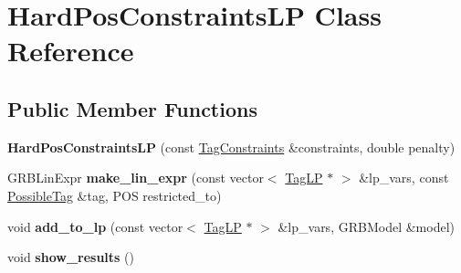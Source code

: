 \hypertarget{classHardPosConstraintsLP}{
\section{HardPosConstraintsLP Class Reference}
\label{classHardPosConstraintsLP}
}
\subsection*{Public Member Functions}
\begin{DoxyCompactItemize}
\item 
\hypertarget{classHardPosConstraintsLP_a2979e37eb163b00f48a38ee8fccd1a64}{
{\bfseries HardPosConstraintsLP} (const \hyperlink{classTagConstraints}{TagConstraints} \&constraints, double penalty)}
\label{classHardPosConstraintsLP_a2979e37eb163b00f48a38ee8fccd1a64}

\item 
\hypertarget{classHardPosConstraintsLP_aa841ffcec001c0ee31714d0d39027c26}{
GRBLinExpr {\bfseries make\_\-lin\_\-expr} (const vector$<$ \hyperlink{structScarab_1_1HG_1_1TagLP}{TagLP} $\ast$ $>$ \&lp\_\-vars, const \hyperlink{structPossibleTag}{PossibleTag} \&tag, POS restricted\_\-to)}
\label{classHardPosConstraintsLP_aa841ffcec001c0ee31714d0d39027c26}

\item 
\hypertarget{classHardPosConstraintsLP_a7a7bb0c41351c9de3130045f0013c67b}{
void {\bfseries add\_\-to\_\-lp} (const vector$<$ \hyperlink{structScarab_1_1HG_1_1TagLP}{TagLP} $\ast$ $>$ \&lp\_\-vars, GRBModel \&model)}
\label{classHardPosConstraintsLP_a7a7bb0c41351c9de3130045f0013c67b}

\item 
\hypertarget{classHardPosConstraintsLP_a4307bcde1a701018736de348a718262b}{
void {\bfseries show\_\-results} ()}
\label{classHardPosConstraintsLP_a4307bcde1a701018736de348a718262b}

\end{DoxyCompactItemize}
